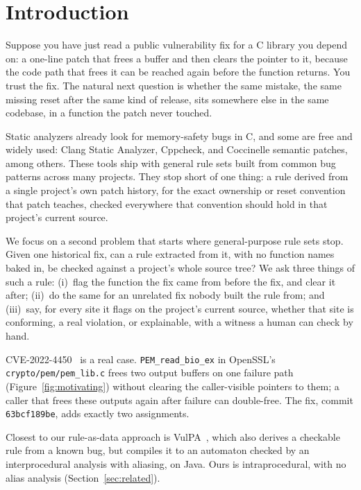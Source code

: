 \section{Introduction}
\label{sec:intro}

Suppose you have just read a public vulnerability fix for a C library you
depend on: a one-line patch that frees a buffer and then clears the
pointer to it, because the code path that frees it can be reached again
before the function returns. You trust the fix. The natural next question
is whether the same mistake, the same missing reset after the same kind
of release, sits somewhere else in the same codebase, in a function the
patch never touched.

Static analyzers already look for memory-safety bugs in C, and some are
free and widely used: Clang Static Analyzer, Cppcheck, and Coccinelle
semantic patches, among others. These tools ship with general rule sets
built from common bug patterns across many projects. They stop short of
one thing: a rule derived from a single project's own patch history, for
the exact ownership or reset convention that patch teaches, checked
everywhere that convention should hold in that project's current source.

We focus on a second problem that starts where general-purpose rule sets
stop. Given one historical fix, can a rule extracted from it, with no
function names baked in, be checked against a project's whole source
tree? We ask three things of such a rule: (i)~flag the function the fix
came from before the fix, and clear it after; (ii)~do the same for an
unrelated fix nobody built the rule from; and (iii)~say, for every site it
flags on the project's current source, whether that site is conforming, a
real violation, or explainable, with a witness a human can check by hand.

CVE-2022-4450~\cite{nvd2022cve4450} is a real case. \texttt{PEM\_read\_bio\_ex} in OpenSSL's
\texttt{crypto/pem/pem\_lib.c} frees two output buffers on one failure
path (Figure~\ref{fig:motivating}) without clearing the caller-visible
pointers to them; a caller that frees these outputs again after failure
can double-free. The fix, commit \texttt{63bcf189be}, adds exactly two
assignments.

Closest to our rule-as-data approach is VulPA~\cite{cao2025vulpa}, which
also derives a checkable rule from a known bug, but compiles it to an
automaton checked by an interprocedural analysis with aliasing, on Java.
Ours is intraprocedural, with no alias analysis (Section~\ref{sec:related}).

